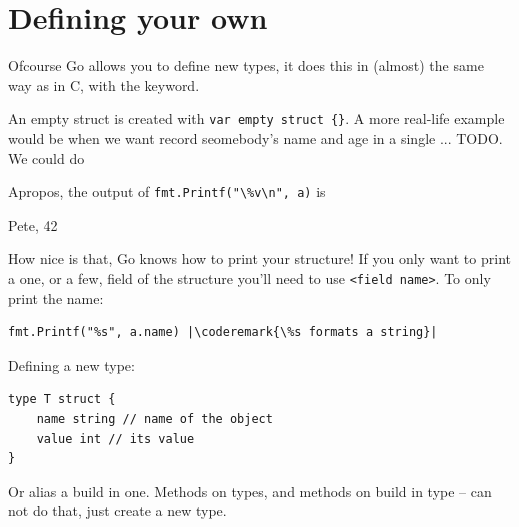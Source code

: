 

\section{Defining your own}
\label{sec:defining your own}
Ofcourse Go allows you to define new types, it does this in (almost) the
same way as in C, with the  keyword.

An empty struct is created with \lstinline|var empty struct {}|{}.
A more real-life example would be when we want record seomebody's name
and age in a single ... TODO. We could do



Apropos, the output of \lstinline{fmt.Printf("\%v\n", a)} is 
\begin{display}
{Pete, 42}
\end{display}
How nice is that, Go knows how to print your structure! If you
only want to print a one, or a few, field of the structure you'll
need to use \verb|<field name>|. To only print the name:
\begin{lstlisting}
fmt.Printf("%s", a.name) |\coderemark{\%s formats a string}|
\end{lstlisting}

Defining a new type:

\begin{lstlisting}
type T struct {
    name string // name of the object
    value int // its value
}
\end{lstlisting}

Or alias a build in one.
Methods on types, and methods on build in type -- can not do that,
just create a new type.


